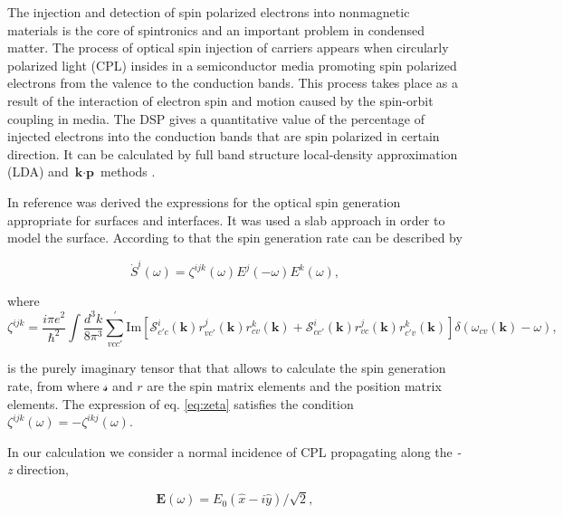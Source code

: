 \documentclass[aps,pra,11pt,tightenlines,showpacs,superscriptaddress,groupedaddress]{revtex4-1}
\begin{document}
The injection and detection of spin polarized electrons into nonmagnetic
materials is the core of spintronics \cite{vzutic2004spintronics,fert2008nobel,
pezzoli2012optical,bottegoni2013experimental,bottegoni2013photoinduced} and an
important problem in condensed matter. The process of optical spin injection of
carriers appears when circularly polarized light (CPL)
\cite{dyakonov1984theory} insides in a semiconductor media promoting spin
polarized electrons from the valence to the conduction bands. This process
takes place as a result of the interaction of electron spin and motion caused
by the spin-orbit coupling in media. The DSP gives a quantitative value of the
percentage of injected electrons into the conduction bands that are spin
polarized in certain direction. It can be calculated by full band structure local-density
approximation (LDA) and $\textbf{k}\cdot \textbf{p}$ methods
\cite{nastos2007full,cabellos2009stress}.

In reference \cite{mendoza2012optical} was derived the expressions for the optical spin generation
appropriate for surfaces and interfaces. It was used a
slab approach in order to model the surface. According to that the spin generation rate can be described by

\begin{equation}
    \dot{S}^{i} (\omega) = \zeta^{ijk} (\omega) E^{j} (-\omega) E^{k} (\omega),
\end{equation}

where
\begin{equation}
    \zeta^{ijk} = \frac{i \pi e^{2}}{\hbar^{2}} \int \frac{d^{3}k}{8\pi^{3}} \sum_{vcc'}^{'} \text{Im} \left[  \mathcal{S}^{i}_{c'c} (\textbf{k}) r^{j}_{vc'}(\textbf{k}) r^{k}_{cv}(\textbf{k})
    + \mathcal{S}^{i}_{cc'} (\textbf{k}) r^{j}_{vc}(\textbf{k}) r^{k}_{c'v}(\textbf{k}) \right] \delta (\omega_{cv}(\textbf{k}) -\omega), \label{eq:zeta}
\end{equation}

is the purely imaginary tensor that that allows to calculate the spin generation rate, from where $\mathcal{s} $ and $r$ are the spin matrix elements and the position matrix elements. The expression of eq. \ref{eq:zeta} satisfies the condition  $\zeta^{ijk} (\omega) = -\zeta^{ikj} (\omega)$. 


In our calculation we consider a normal incidence of CPL propagating along the \emph{-z} direction,

\begin{equation*}
    \mathbf{E} (\omega) = E_{0}(\hat{x} -i \hat{y})/\sqrt{2}, 
\end{equation*}
\end{document}
